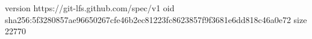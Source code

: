 version https://git-lfs.github.com/spec/v1
oid sha256:5f3280857ae96650267cfe46b2ec81223fc8623857f9f3681e6dd818c46a0e72
size 22770
